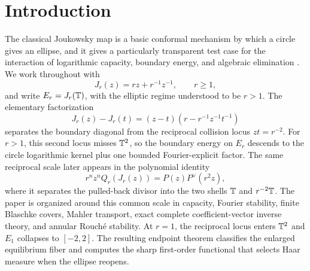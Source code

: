 \section{Introduction}\label{sec:introduction}
The classical Joukowsky map is a basic conformal mechanism by which a
circle gives an ellipse, and it gives a particularly transparent test
case for the interaction of logarithmic capacity, boundary energy, and
algebraic elimination \citep{Pommerenke1992,Tsuji1959,Ransford1995,SaffTotik1997,StahlTotik1992,GKZ1994}.  We work throughout with
\[
J_r(z)=rz+r^{-1}z^{-1},\qquad r\ge1,
\]
and write \(E_r=J_r(\mathbb{T})\), with the elliptic regime understood to be
\(r>1\).  The elementary factorization
\[
J_r(z)-J_r(t)=(z-t)\left(r-r^{-1}z^{-1}t^{-1}\right)
\]
separates the boundary diagonal from the reciprocal collision locus
\(zt=r^{-2}\).  For \(r>1\), this second locus misses \(\mathbb{T}^2\), so the boundary
energy on \(E_r\) descends to the circle logarithmic kernel plus one
bounded Fourier-explicit factor.  The same reciprocal scale later
appears in the polynomial identity
\[
r^nz^nQ_r(J_r(z))=P(z)P^\vee(r^2z),
\]
where it separates the pulled-back divisor into the two shells
\(\mathbb{T}\) and \(r^{-2}\mathbb{T}\).  The paper is organized around this common
scale in capacity, Fourier stability, finite Blaschke covers, Mahler
transport, exact complete coefficient-vector inverse theory, and annular
Rouch\'e stability.
At \(r=1\), the reciprocal locus enters \(\mathbb{T}^2\) and \(E_1\) collapses
to \([-2,2]\).  The resulting endpoint theorem classifies the enlarged
equilibrium fiber and computes the sharp first-order functional that
selects Haar measure when the ellipse reopens.

